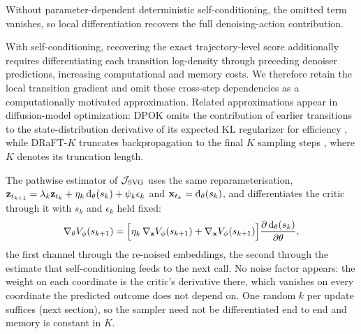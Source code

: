 Without parameter-dependent deterministic self-conditioning, the omitted term vanishes, so local differentiation recovers the full denoising-action contribution.

With self-conditioning, recovering the exact trajectory-level score additionally requires differentiating each transition log-density through preceding denoiser predictions, increasing computational and memory costs. We therefore retain the local transition gradient and omit these cross-step dependencies as a computationally motivated approximation. Related approximations appear in diffusion-model optimization: DPOK omits the contribution of earlier transitions to the state-distribution derivative of its expected KL regularizer for efficiency \citep[Section~4.1 and Appendix~A.3]{fan2023dpok}, while DRaFT-$K$ truncates backpropagation to the final $K$ sampling steps \citep{clark2023draft}, where $K$ denotes its truncation length. 
\endgroup

The pathwise estimator of $\mathcal J_{\rm SVG}$ uses the same reparameterisation, ${\mathbf{z}}_{t_{k+1}}=\lambda_k{\mathbf{z}}_{t_k}+\eta_k\,\mathrm d_\theta(s_k)+\psi_k\epsilon_k$ and ${\mathbf{x}}_{t_k}=\mathrm d_\theta(s_k)$, and differentiates the critic through it with $s_k$ and $\epsilon_k$ held fixed:
\begin{equation}
\nabla_\theta V_\phi(s_{k+1})=\Big[\eta_k\,\nabla_{{\mathbf{z}}}V_\phi(s_{k+1})+\nabla_{{\mathbf{x}}}V_\phi(s_{k+1})\Big]\frac{\partial\,\mathrm d_\theta(s_k)}{\partial\theta},
\label{eq:pwgrad}
\end{equation}
the first channel through the re-noised embeddings, the second through the estimate that self-conditioning feeds to the next call. No noise factor appears: the weight on each coordinate is the critic's derivative there, which vanishes on every coordinate the predicted outcome does not depend on. One random $k$ per update suffices (next section), so the sampler need not be differentiated end to end and memory is constant in $K$.


